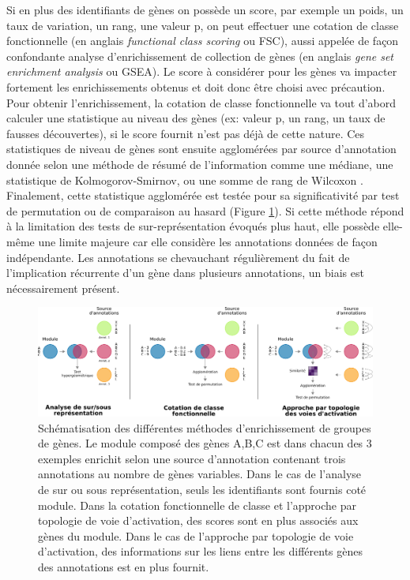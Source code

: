 Si en plus des identifiants de gènes on possède un score, par exemple un poids, un taux de variation, un rang, une valeur p, on peut effectuer une cotation de classe fonctionnelle (en anglais \textit{functional class scoring} ou FSC), aussi appelée de façon confondante analyse d'enrichissement de collection de gènes (en anglais \textit{gene set enrichment analysis} ou GSEA). Le score à considérer pour les gènes va impacter fortement les enrichissements obtenus \cite{Ackermann2009Dec} et doit donc être choisi avec précaution. Pour obtenir l'enrichissement, la cotation de classe fonctionnelle va tout d'abord calculer une statistique au niveau des gènes (ex: valeur p, un rang, un taux de fausses découvertes), si le score fournit n'est pas déjà de cette nature. Ces statistiques de niveau de gènes sont ensuite agglomérées par source d'annotation donnée selon une méthode de résumé de l'information comme une médiane, une statistique de Kolmogorov-Smirnov, ou une somme de rang de Wilcoxon \cite{Khatri2012}. Finalement, cette statistique agglomérée est testée pour sa significativité par test de permutation ou de comparaison au hasard (Figure \ref{fig:enrichment_methods}). Si cette méthode répond à la limitation des tests de sur-représentation évoqués plus haut, elle possède elle-même une limite majeure car elle considère les annotations données de façon indépendante. Les annotations se chevauchant régulièrement du fait de l'implication récurrente d'un gène dans plusieurs annotations, un biais est nécessairement présent.

\begin{figure}[hb]
    \centering
    \includegraphics[width=\textwidth]{img/intro/3_coexpr/intro_3_coexpr_enrichment_methods.pdf} 
    \caption[Schématisation des différentes méthodes d'enrichissement de groupes de gènes.]{Schématisation des différentes méthodes d'enrichissement de groupes de gènes. Le module composé des gènes A,B,C est dans chacun des 3 exemples enrichit selon une source d'annotation contenant trois annotations au nombre de gènes variables. Dans le cas de l'analyse de sur ou sous représentation, seuls les identifiants sont fournis coté module. Dans la cotation fonctionnelle de classe et l'approche par topologie de voie d'activation, des scores sont en plus associés aux gènes du module. Dans le cas de l'approche par topologie de voie d'activation, des informations sur les liens entre les différents gènes des annotations est en plus fournit.}
    \label{fig:enrichment_methods}
\end{figure}


